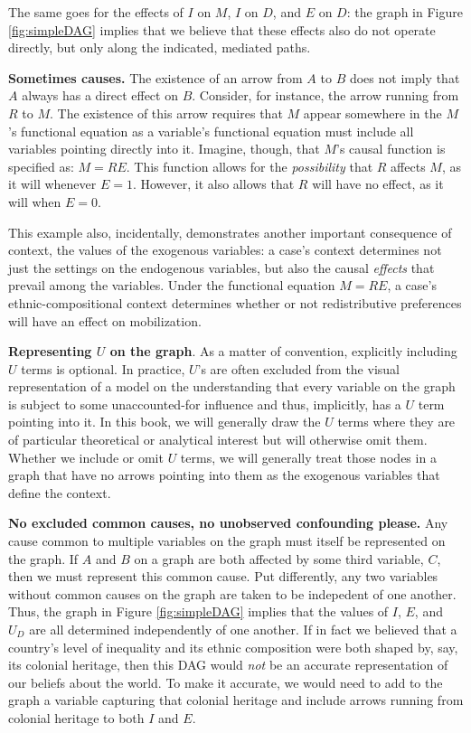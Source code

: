 \documentclass[12pt,]{book}
\begin{document}
The same goes for the effects of \(I\) on \(M\), \(I\) on \(D\), and \(E\) on \(D\): the graph in Figure \ref{fig:simpleDAG} implies that we believe that these effects also do not operate directly, but only along the indicated, mediated paths.

\textbf{Sometimes causes.} The existence of an arrow from \(A\) to \(B\) does not imply that \(A\) always has a direct effect on \(B\). Consider, for instance, the arrow running from \(R\) to \(M\). The existence of this arrow requires that \(M\) appear somewhere in the \(M\)'s functional equation as a variable's functional equation must include all variables pointing directly into it. Imagine, though, that \(M\)'s causal function is specified as: \(M = RE\). This function allows for the \emph{possibility} that \(R\) affects \(M\), as it will whenever \(E=1\). However, it also allows that \(R\) will have no effect, as it will when \(E=0\).

This example also, incidentally, demonstrates another important consequence of context, the values of the exogenous variables: a case's context determines not just the settings on the endogenous variables, but also the causal \emph{effects} that prevail among the variables. Under the functional equation \(M=RE\), a case's ethnic-compositional context determines whether or not redistributive preferences will have an effect on mobilization.

\textbf{Representing \(U\) on the graph}. As a matter of convention, explicitly including \(U\) terms is optional. In practice, \(U\)'s are often excluded from the visual representation of a model on the understanding that every variable on the graph is subject to some unaccounted-for influence and thus, implicitly, has a \(U\) term pointing into it. In this book, we will generally draw the \(U\) terms where they are of particular theoretical or analytical interest but will otherwise omit them. Whether we include or omit \(U\) terms, we will generally treat those nodes in a graph that have no arrows pointing into them as the exogenous variables that define the context.

\textbf{No excluded common causes, no unobserved confounding please.} Any cause common to multiple variables on the graph must itself be represented on the graph. If \(A\) and \(B\) on a graph are both affected by some third variable, \(C\), then we must represent this common cause. Put differently, any two variables without common causes on the graph are taken to be indepedent of one another. Thus, the graph in Figure \ref{fig:simpleDAG} implies that the values of \(I\), \(E\), and \(U_D\) are all determined independently of one another. If in fact we believed that a country's level of inequality and its ethnic composition were both shaped by, say, its colonial heritage, then this DAG would \emph{not} be an accurate representation of our beliefs about the world. To make it accurate, we would need to add to the graph a variable capturing that colonial heritage and include arrows running from colonial heritage to both \(I\) and \(E\).
\end{document}
